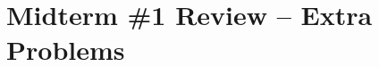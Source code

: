\documentclass[letterpaper, fontsize=12pt]{scrartcl} %
\numberwithin{equation}{section} %
\numberwithin{figure}{section} %
\numberwithin{table}{section} %
\begin{document}

\newcommand{\horrule}[1]{\rule{\linewidth}{#1}} %


\section*{Midterm \#1 Review -- Extra Problems}
\end{document}
